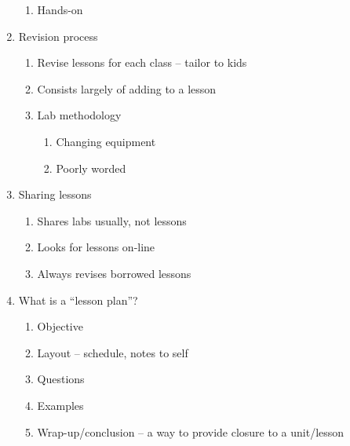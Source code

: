 \documentclass[11pt,letter]{article}
\begin{document}
\begin{enumerate}
\begin{enumerate}
			\item Hands-on
		\end{enumerate}

	\item Revision process
		\begin{enumerate}
			\item Revise lessons for each class -- tailor to kids

			\item Consists largely of adding to a lesson

			\item Lab methodology
				\begin{enumerate}
					\item Changing equipment

					\item Poorly worded
				\end{enumerate}

		\end{enumerate}

	\item Sharing lessons
		\begin{enumerate}
			\item Shares labs usually, not lessons

			\item Looks for lessons on-line

			\item Always revises borrowed lessons

		\end{enumerate}

	\item What is a ``lesson plan''?
		\begin{enumerate}
			\item Objective

			\item Layout -- schedule, notes to self

			\item Questions

			\item Examples

			\item Wrap-up/conclusion -- a way to provide closure to a
				unit/lesson

		\end{enumerate}

\end{enumerate}
\end{document}
